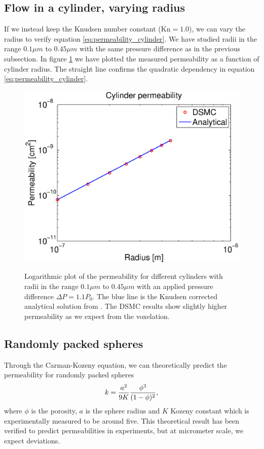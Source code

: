 \subsection{Flow in a cylinder, varying radius}
If we instead keep the Knudsen number constant ($\text{Kn}=1.0$), we can vary the radius to verify equation \eqref{eq:permeability_cylinder}. We have studied radii in the range $0.1 \mu m$ to $0.45 \mu m$ with the same pressure difference as in the previous subsection. In figure \ref{fig:one_cylinder_varying_radii_result} we have plotted the measured permeability as a function of cylinder radius. The straight line confirms the quadratic dependency in equation \eqref{eq:permeability_cylinder}.
\begin{figure}[h]
\begin{center}
\includegraphics[width=\textwidth, trim=0cm 0cm 0cm 0cm, clip]{DSMC/figures/cylinder_radius_permeability.eps}
\label{fig:one_cylinder_varying_radii_result}
\end{center}
\caption{Logarithmic plot of the permeability for different cylinders with radii in the range $0.1 \mu m$ to $0.45 \mu m$ with an applied pressure difference $\Delta P = 1.1P_0$. The blue line is the Knudsen corrected analytical solution from \cite{karniadakis2005microflows}. The DSMC results show slightly higher permeability as we expect from the voxelation.}
\end{figure}

\subsection{Randomly packed spheres}
Through the Carman-Kozeny equation, we can theoretically predict the permeability for randomly packed spheres 
\begin{align}
	k = {a^2 \over 9K} {\phi^3 \over (1 - \phi)^2},
\end{align}
where $\phi$ is the porosity, $a$ is the sphere radius and $K$ Kozeny constant which is experimentally measured to be around five\cite{carman1937fluid}. This theoretical result has been verified to predict permeabilities in experiments, but at micrometer scale, we expect deviations. 
